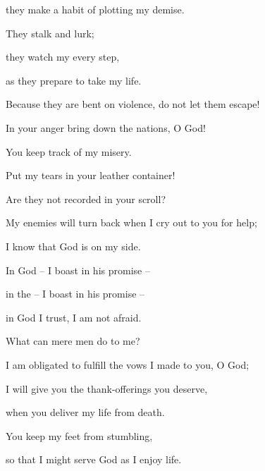 {\par }{\Q they make a habit
of plotting
my demise.
\par }{\Q {}They
stalk
and lurk;
\par }{\Q they
watch
my every step,

\par }{\Q as they prepare to take my life.
\par }{\Q {}Because
they are bent on violence,
do not let them escape!

\par }{\Q In your anger
bring down
the nations,
O God!
\par }{\Q {}You keep
track
of my misery.
\par }{\Q Put
my tears
in your leather container!

\par }{\Q Are they not
recorded in your scroll?
\par }{\Q {}My enemies
will turn
back
when
I cry
out to you for help;

\par }{\Q I know
that
God is on my side.
\par }{\Q {}In God
– I boast
in his promise –
\par }{\Q in the
{}
–
I boast
in his promise –
\par }{\Q {}in God
I trust,
I am not
afraid.
\par }{\Q What
can mere men
do to me?
\par }{\Q {}I
am obligated
to fulfill
the vows
I made to you, O God;
\par }{\Q I will give you the thank-offerings you deserve,
\par }{\Q {}when
you deliver
my life
from death.
\par }{\Q You keep my feet
from stumbling,
\par }{\Q so that I might serve
God
as I enjoy life.


\par }
